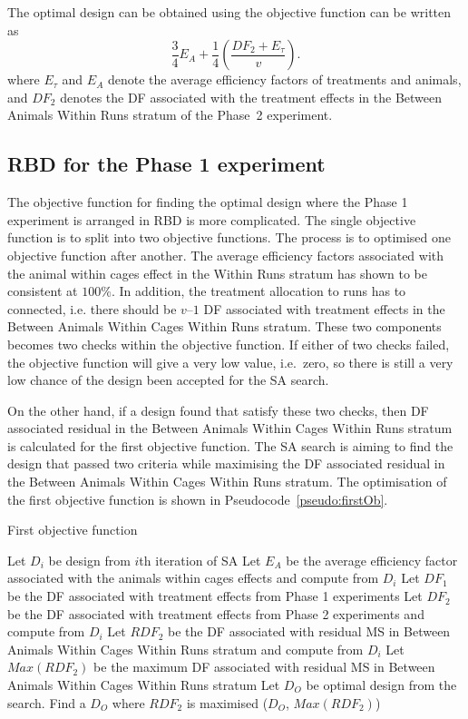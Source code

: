 \documentclass[article]{jss}
\begin{document}
The optimal design can be obtained using the objective function can be written as 
\begin{equation}\label{eq:finalObjFun2}
\frac{3}{4} E_A + \frac{1}{4} \left(\frac{DF_2 + E_\tau}{v}\right).
\end{equation}
where $E_\tau$ and $E_A$ denote the average efficiency factors of treatments and animals, and $DF_2$ denotes the DF associated with the treatment effects in the Between Animals Within Runs stratum of the Phase~2 experiment.


\subsection{RBD for the Phase 1 experiment}
The objective function for finding the optimal design where the Phase 1 experiment is arranged in RBD is more complicated. The single objective function is to split into two objective functions. The process is to optimised one objective function after another. The average efficiency factors associated with the animal within cages effect in the Within Runs stratum has shown to be consistent at $100\%$. In addition, the treatment allocation to runs has to connected, i.e. there should be $v – 1$ DF associated with treatment effects in the Between Animals Within Cages Within Runs stratum. These two components becomes two checks within the objective function. If either of two checks failed, the objective function will give a very low value, i.e.\ zero, so there is still a very low chance of the design been accepted for the SA search. 

On the other hand, if a design found that satisfy these two checks, then DF associated residual in the Between Animals Within Cages Within Runs stratum is calculated for the first objective function. The SA search is aiming to find the design that passed two criteria while maximising the DF associated residual in the Between Animals Within Cages Within Runs stratum. The optimisation of the first objective function is shown in Pseudocode~\ref{pseudo:firstOb}.


\begin{algorithm}[ht]                     
\caption{First objective function}         
\label{pseudo:firstOb}                           
\begin{algorithmic}[1]
\STATE Let $D_i$ be design from $i$th iteration of SA
\STATE Let $E_A$ be the average efficiency factor associated with the animals within cages effects and compute from $D_i$
\STATE Let $DF_1$ be the DF associated with treatment effects from Phase 1 experiments
\STATE Let $DF_2$ be the DF associated with treatment effects from Phase 2 experiments and compute from $D_i$
\STATE Let $RDF_2$ be the DF associated with residual MS in Between Animals Within Cages Within Runs stratum and compute from $D_i$
\STATE Let $Max(RDF_2)$ be the maximum DF associated with residual MS in Between Animals Within Cages Within Runs stratum
\STATE Let $D_O$ be optimal design from the search.
\ENDIF
{}
\ENDIF
\STATE Find a $D_O$ where $RDF_2$ is maximised 
\RETURN ($D_O$, $Max(RDF_2)$)
\end{algorithmic}
\end{algorithm}
\end{document}
